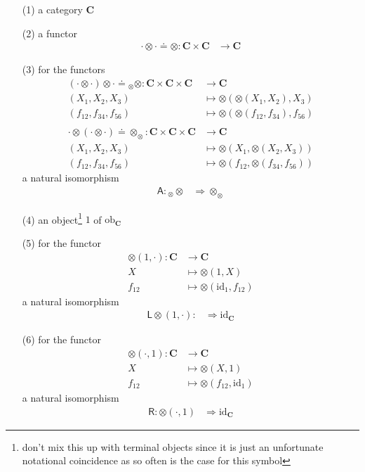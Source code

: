 \begin{enumerate}
\item[(1)]
a category $\mathbf{C}$
\item[(2)]
a functor
\begin{align*}
  \cdot
  \otimes
  \cdot
  \doteq
  \otimes
  \colon
  \mathbf{C}
  \times
  \mathbf{C}
  &\rightarrow
  \mathbf{C}
\end{align*}
\item[(3)]
for the functors
\begin{align*}
  \left(
    \cdot
    \otimes
    \cdot
  \right)
  \otimes
  \cdot
  \doteq
  {}_{\otimes}\otimes
  \colon
  \mathbf{C}
  \times
  \mathbf{C}
  \times
  \mathbf{C}
  &\rightarrow
  \mathbf{C}
  \\
  (X_{1},X_{2},X_{3})
  &\mapsto
  \otimes(\otimes(X_{1},X_{2}),X_{3})
  \\
  (f_{12},f_{34},f_{56})
  &\mapsto
  \otimes(\otimes(f_{12},f_{34}),f_{56})
  \\\\
  \cdot
  \otimes
  \left(
    \cdot
    \otimes
    \cdot
  \right)
  \doteq
  \otimes_{\otimes}
  \colon
  \mathbf{C}
  \times
  \mathbf{C}
  \times
  \mathbf{C}
  &\rightarrow
  \mathbf{C}
  \\
  (X_{1},X_{2},X_{3})
  &\mapsto
  \otimes(X_{1},\otimes(X_{2},X_{3}))
  \\
  (f_{12},f_{34},f_{56})
  &\mapsto
  \otimes(f_{12},\otimes(f_{34},f_{56}))
\end{align*}
a natural isomorphism
\begin{align*}
  \mathsf{A}
  \colon
  {}_{\otimes}\otimes
  &\Rightarrow
  \otimes_{\otimes}
\end{align*}
\item[(4)]
an object\footnote{don't mix this up with terminal objects since it is just an unfortunate notational coincidence as so often is the case for this symbol} $1$ of $\mathrm{ob}_{\mathbf{C}}$
\item[(5)]
for the functor
\begin{align*}
  \otimes(1,\cdot)
  \colon
  \mathbf{C}
  &\rightarrow
  \mathbf{C}
  \\
  X
  &\mapsto
  \otimes(1,X)
  \\
  f_{12}
  &\mapsto
  \otimes(\mathrm{id}_{1},f_{12})
\end{align*}
a natural isomorphism
\begin{align*}
  \mathsf{L}
  \otimes(1,\cdot)
  \colon
  &\Rightarrow
  \mathrm{id}_{\mathbf{C}}
\end{align*}
\item[(6)]
for the functor
\begin{align*}
  \otimes(\cdot,1)
  \colon
  \mathbf{C}
  &\rightarrow
  \mathbf{C}
  \\
  X
  &\mapsto
  \otimes(X,1)
  \\
  f_{12}
  &\mapsto
  \otimes(f_{12},\mathrm{id}_{1})
\end{align*}
a natural isomorphism
\begin{align*}
  \mathsf{R}
  \colon
  \otimes(\cdot,1)
  &\Rightarrow
  \mathrm{id}_{\mathbf{C}}
\end{align*}
\end{enumerate}
